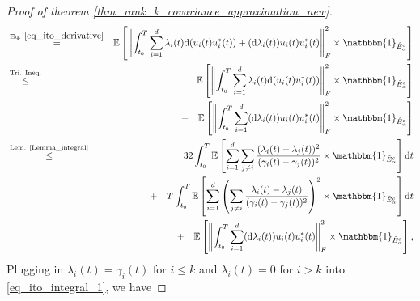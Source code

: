 \documentclass[11pt,letterpaper]{article}
\begin{document}
\begin{proof}[Proof of theorem \ref{thm_rank_k_covariance_approximation_new}]
\begin{eqnarray}
%
&\stackrel{\textrm{Eq. } \eqref{eq_ito_derivative}}{=}&  \mathbb{E}\left[\left\|\int_{t_0}^T \sum_{i=1}^d   \lambda_i(t) \mathrm{d}( u_i(t) u_i^\ast(t)) + (\mathrm{d} \lambda_i(t)) u_i(t) u_i^\ast(t) \right\|_F^2 \times \mathbbm{1}_{\hat{E}_\alpha^c} \right] \nonumber\\
%
&\stackrel{\textrm{Tri. Ineq.}}{\leq} & \mathbb{E}\left[\left\|\int_{t_0}^T \sum_{i=1}^d   \lambda_i(t) \mathrm{d}( u_i(t) u_i^\ast(t))\right\|_F^2 \times \mathbbm{1}_{\hat{E}_\alpha^c} \right]\nonumber \\
& & + \quad  \mathbb{E}\left[ \left\|\int_{t_0}^T \sum_{i=1}^d  (\mathrm{d} \lambda_i(t)) u_i(t) u_i^\ast(t) \right\|_F^2 \times \mathbbm{1}_{\hat{E}_\alpha^c}\right]  \nonumber\\
%
%
%
%
%
&\stackrel{\textrm{Lem. \ref{Lemma_integral}}}{\leq}  & 32 \int_{t_0}^{T}  \mathbb{E}\left[ \sum_{i=1}^{d}  \sum_{j \neq i}  \frac{(\lambda_i(t) - \lambda_j(t))^2}{(\gamma_i(t)- \gamma_j(t))^2} \times \mathbbm{1}_{\hat{E}_\alpha^c}\right]\mathrm{d}t \nonumber \\
    & &  +  \quad    T \int_{t_0}^{T}\mathbb{E}\left[\sum_{i=1}^{d}\left(\sum_{j\neq i} \frac{\lambda_i(t) - \lambda_j(t)}{(\gamma_i(t)- \gamma_j(t))^2}\right)^2 \times \mathbbm{1}_{\hat{E}_\alpha^c}\right] \mathrm{d}t \nonumber\\
    & & + \quad \mathbb{E}\left[\left\|\int_{t_0}^T \sum_{i=1}^d (\mathrm{d} \lambda_i(t))  u_i(t) u_i^\ast(t) \right\|_F^2 \times \mathbbm{1}_{\hat{E}_\alpha^c} \right],
\end{eqnarray}
%
%
%
%
Plugging in $\lambda_i(t) = \gamma_i(t)$ for $i \leq k$ and $\lambda_i(t) = 0$  for $i>k$ into \eqref{eq_ito_integral_1}, we have


\end{proof}
\end{document}

